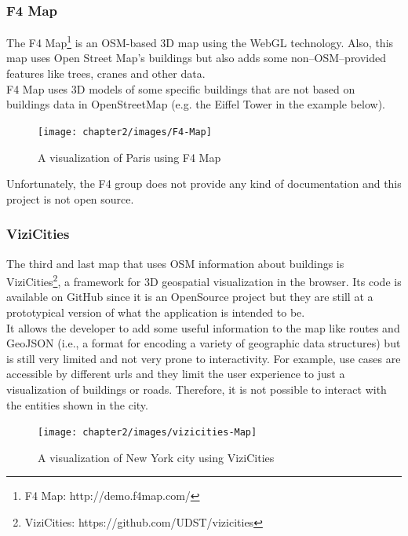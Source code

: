 \subsubsection{F4 Map}
The F4 Map\footnote{F4 Map: http://demo.f4map.com/} is an OSM-based 3D map using the WebGL technology. Also, this map uses Open Street Map's buildings but also adds some non--OSM--provided features like trees, cranes and other data.\\
 F4 Map uses 3D models of some specific buildings that are not based on buildings data in OpenStreetMap (e.g. the Eiffel Tower in the example below).
\begin{figure}[H]
\centering
\texttt{[image: chapter2/images/F4-Map]}
\caption{A visualization of Paris using F4 Map}
\label{fig:F4-Map}
\end{figure}
Unfortunately, the F4 group does not provide any kind of documentation and this project is not open source.
\subsubsection{ViziCities}
The third and last map that uses OSM information about buildings is ViziCities\footnote{ViziCities: https://github.com/UDST/vizicities}, a framework for 3D geospatial visualization in the browser. Its code is available on GitHub since it is an OpenSource project but they are still at a prototypical version of what the application is intended to be.\\It allows the developer to add some useful information to the map like routes and GeoJSON (i.e., a format for encoding a variety of geographic data structures) but is still very limited and not very prone to interactivity. For example, use cases are accessible by different urls and they limit the user experience to just a visualization of buildings or roads. Therefore, it is not possible to interact with the entities shown in the city. 
\begin{figure}[H]
\centering
\texttt{[image: chapter2/images/vizicities-Map]}
\caption{A visualization of New York city using ViziCities}
\label{fig:vizicities-Map}
\end{figure}

